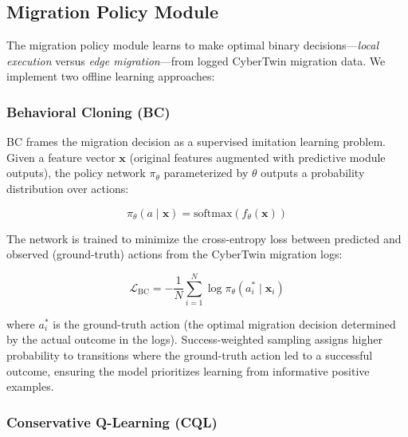 \documentclass[journal,twoside]{IEEEtran}
\begin{document}
\subsection{Migration Policy Module}
\label{sec:policy}

The migration policy module learns to make optimal binary decisions---\emph{local execution} versus \emph{edge migration}---from logged CyberTwin migration data. We implement two offline learning approaches:

\subsubsection{Behavioral Cloning (BC)}

BC frames the migration decision as a supervised imitation learning problem. Given a feature vector $\mathbf{x}$ (original features augmented with predictive module outputs), the policy network $\pi_\theta$ parameterized by $\theta$ outputs a probability distribution over actions:

\begin{equation}
\pi_\theta(a \mid \mathbf{x}) = \text{softmax}(f_\theta(\mathbf{x}))
\end{equation}

The network is trained to minimize the cross-entropy loss between predicted and observed (ground-truth) actions from the CyberTwin migration logs:

\begin{equation}
\mathcal{L}_{\text{BC}} = -\frac{1}{N} \sum_{i=1}^{N} \log \pi_\theta(a_i^* \mid \mathbf{x}_i)
\end{equation}

where $a_i^*$ is the ground-truth action (the optimal migration decision determined by the actual outcome in the logs). Success-weighted sampling assigns higher probability to transitions where the ground-truth action led to a successful outcome, ensuring the model prioritizes learning from informative positive examples.

\subsubsection{Conservative Q-Learning (CQL)}
\end{document}
